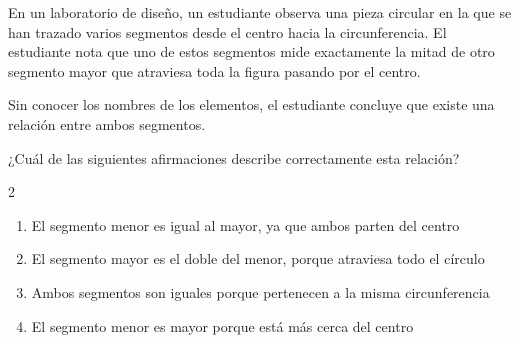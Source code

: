 En un laboratorio de diseño, un estudiante observa una pieza circular en la que se han trazado varios segmentos desde el centro hacia la circunferencia. El estudiante nota que uno de estos segmentos mide exactamente la mitad de otro segmento mayor que atraviesa toda la figura pasando por el centro.

Sin conocer los nombres de los elementos, el estudiante concluye que existe una relación entre ambos segmentos.

¿Cuál de las siguientes afirmaciones describe correctamente esta relación?

\begin{multicols}{2}
\begin{enumerate}[label=\alph*), leftmargin=*]
\item El segmento menor es igual al mayor, ya que ambos parten del centro
\item El segmento mayor es el doble del menor, porque atraviesa todo el círculo
\item Ambos segmentos son iguales porque pertenecen a la misma circunferencia
\item El segmento menor es mayor porque está más cerca del centro
\end{enumerate}
\end{multicols}